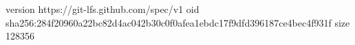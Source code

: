 version https://git-lfs.github.com/spec/v1
oid sha256:284f20960a22bc82d4ac042b30c0f0afea1ebdc17f9dfd396187ce4bec4f931f
size 128356
